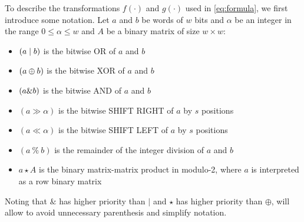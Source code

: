 \documentclass[preprint,1p,times]{elsarticle}
\begin{document}
\noindent To describe the transformations $f(\cdot)$ and $g(\cdot)$ used in \eqref{eq:formula}, we first introduce some notation. Let $a$ and $b$ be words of $w$ bits and $\alpha$ be an integer in the range $0\le \alpha \le w$ and $A$ be a binary matrix of size $w \times w$:
\begin{itemize}
    \item $(a \mid b)$ is the bitwise OR of $a$ and $b$
    \item $(a \mathbin{\oplus} b)$ is the bitwise XOR of $a$ and $b$
    \item $(a \& b)$ is the bitwise AND of $a$ and $b$
    \item $(a \gg \alpha)$ is the bitwise SHIFT RIGHT of $a$ by $s$ positions
    \item $(a \ll \alpha)$ is the bitwise SHIFT LEFT of $a$ by $s$ positions
    \item $(a~\%~b)$ is the remainder of the integer division of $a$ and $b$
    \item $a \star A$ is the binary matrix-matrix product in modulo-2, where $a$ is interpreted as a row binary matrix
\end{itemize}
Noting that $\&$ has higher priority than $\mid$ and $\star$ has higher priority than $\oplus$, will allow to avoid unnecessary parenthesis and simplify notation.
\end{document}

